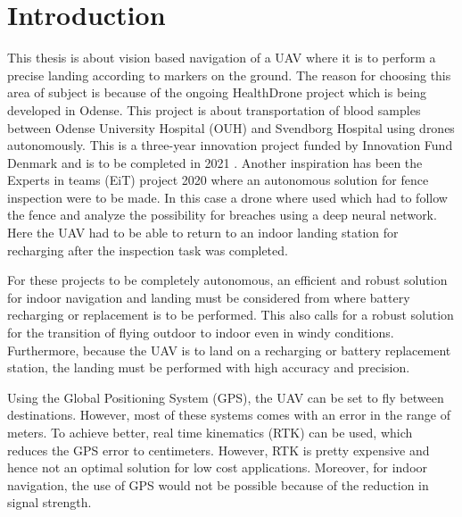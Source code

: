 \documentclass[../Head/report.tex]{subfiles}
\begin{document}
\section{Introduction}

This thesis is about vision based navigation of a UAV where it is to perform a precise landing according to markers on the ground. The reason for choosing this area of subject is because of the ongoing HealthDrone project which is being developed in Odense. This project is about transportation of blood samples between Odense University Hospital (OUH) and Svendborg Hospital using drones autonomously. This is a three-year innovation project funded by Innovation Fund Denmark and is to be completed in 2021 \cite{HealthDrone}. Another inspiration has been the Experts in teams (EiT) project 2020 where an autonomous solution for fence inspection were to be made. In this case a drone where used which had to follow the fence and analyze the possibility for breaches using a deep neural network. Here the UAV had to be able to return to an indoor landing station for recharging after the inspection task was completed.     

For these projects to be completely autonomous, an efficient and robust solution for indoor navigation and landing must be considered from where battery recharging or replacement is to be performed. This also calls for a robust solution for the transition of flying outdoor to indoor even in windy conditions. Furthermore, because the UAV is to land on a recharging or battery replacement station, the landing must be performed with high accuracy and precision.

Using the Global Positioning System (GPS), the UAV can be set to fly between destinations. However, most of these systems comes with an error in the range of meters. To achieve better, real time kinematics (RTK) can be used, which reduces the GPS error to centimeters. However, RTK is pretty expensive and hence not an optimal solution for low cost applications. Moreover, for indoor navigation, the use of GPS would not be possible because of the reduction in signal strength. 
\end{document}
